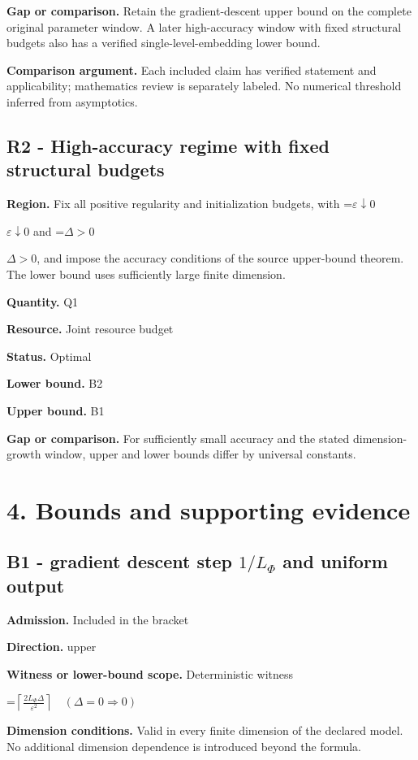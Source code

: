 \documentclass[10pt,a4paper]{article}
\newcommand{\AtlasMath}[1]{\par\begingroup\centering\setbox0=\hbox{$\displaystyle #1$}\ifdim\wd0>1.4\linewidth\typeout{ATLAS WIDE FORMULA: \the\wd0}\fi\ifdim\wd0>\linewidth\resizebox{\linewidth}{!}{\box0}\else\box0\fi\par\endgroup}
\newcommand{\AtlasInlineMath}[1]{\begingroup\setbox0=\hbox{$#1$}\ifdim\wd0>.4\linewidth\endgroup\AtlasMath{#1}\else\endgroup$#1$\fi}
\begin{document}
\textbf{Gap or comparison.} Retain the gradient-descent upper bound on the complete original parameter window. A later high-accuracy window with fixed structural budgets also has a verified single-level-embedding lower bound.

\textbf{Comparison argument.} Each included claim has verified statement and applicability; mathematics review is separately labeled. No numerical threshold inferred from asymptotics.

\subsection{R2 - High-accuracy regime with fixed structural budgets}
\textbf{Region.} Fix all positive regularity and initialization budgets, with \AtlasInlineMath{\varepsilon\downarrow0} and \AtlasInlineMath{\Delta>0}, and impose the accuracy conditions of the source upper-bound theorem. The lower bound uses sufficiently large finite dimension.

\textbf{Quantity.} Q1

\textbf{Resource.} Joint resource budget

\textbf{Status.} Optimal

\textbf{Lower bound.} B2

\textbf{Upper bound.} B1

\textbf{Gap or comparison.} For sufficiently small accuracy and the stated dimension-growth window, upper and lower bounds differ by universal constants.

\section{4. Bounds and supporting evidence}
\subsection{B1 - gradient descent step $1/L_\Phi$ and uniform output}
\textbf{Admission.} Included in the bracket

\textbf{Direction.} upper

\textbf{Witness or lower-bound scope.} Deterministic witness

\AtlasMath{\left\lceil\frac{2L_\Phi\Delta}{\varepsilon^2}\right\rceil\quad(\Delta=0\Rightarrow0)}
\textbf{Dimension conditions.} Valid in every finite dimension of the declared model. No additional dimension dependence is introduced beyond the formula.
\end{document}
